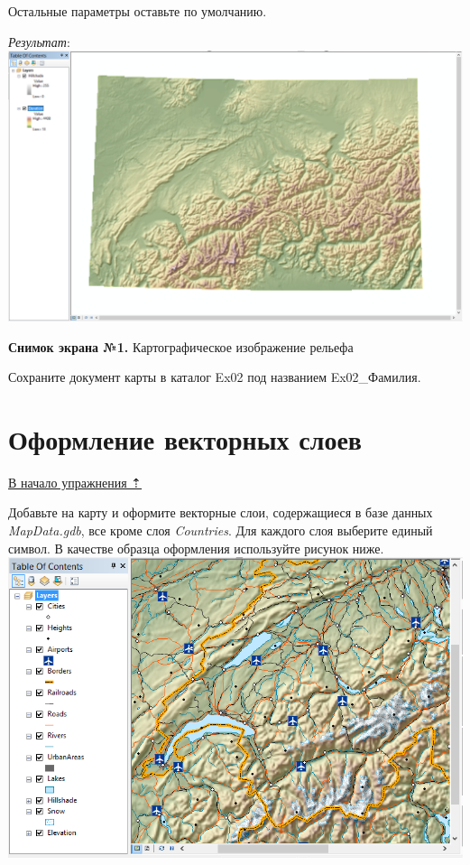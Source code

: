 \documentclass[]{book}
\theoremstyle{definition}
\theoremstyle{definition}
\theoremstyle{definition}
\theoremstyle{remark}
\begin{document}
\begin{enumerate}
  Остальные параметры оставьте по умолчанию.

  \emph{Результат}: \includegraphics{images/Ex02/image13.png}
\end{enumerate}

\textbf{Снимок экрана №1.} Картографическое изображение рельефа

Сохраните документ карты в каталог Ex02 под названием Ex02\_Фамилия.

\hypertarget{map-design-general-vector}{%
\section{Оформление векторных слоев}\label{map-design-general-vector}}

\protect\hyperlink{map-design-general}{В начало упражнения ⇡}

Добавьте на карту и оформите векторные слои, содержащиеся в базе данных
\emph{MapData.gdb}, все кроме слоя \emph{Countries}. Для каждого слоя
выберите единый символ. В качестве образца оформления используйте
рисунок ниже. \includegraphics{images/Ex02/image14.png}
\end{document}
